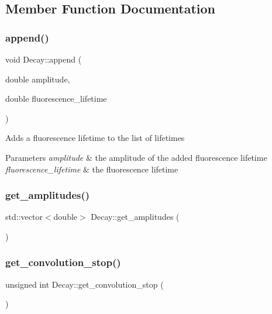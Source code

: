 \subsection{Member Function Documentation}
\mbox{\label{class_decay_a5880e6660875552ae7590227637eca9e}} 
\subsubsection{\texorpdfstring{append()}{append()}}
{\footnotesize\ttfamily void Decay\+::append (\begin{DoxyParamCaption}\item[{double}]{amplitude,  }\item[{double}]{fluorescence\+\_\+lifetime }\end{DoxyParamCaption})}

Adds a fluorescence lifetime to the list of lifetimes 
\begin{DoxyParams}{Parameters}
{\em amplitude} & the amplitude of the added fluorescence lifetime \\
\hline
{\em fluorescence\+\_\+lifetime} & the fluorescence lifetime \\
\hline
\end{DoxyParams}
\mbox{\label{class_decay_a4e82ac52493fe7b56f023013c249de93}} 
\subsubsection{\texorpdfstring{get\+\_\+amplitudes()}{get\_amplitudes()}}
{\footnotesize\ttfamily std\+::vector$<$double$>$ Decay\+::get\+\_\+amplitudes (\begin{DoxyParamCaption}{ }\end{DoxyParamCaption})}

\mbox{\label{class_decay_ab0aa645c91bde2887b132af2f3ea97ed}} 
\subsubsection{\texorpdfstring{get\+\_\+convolution\+\_\+stop()}{get\_convolution\_stop()}}
{\footnotesize\ttfamily unsigned int Decay\+::get\+\_\+convolution\+\_\+stop (\begin{DoxyParamCaption}{ }\end{DoxyParamCaption})}

